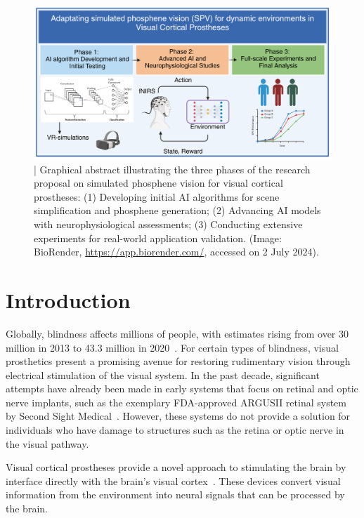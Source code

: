 \documentclass[10pt]{article}
\begin{document}
\pagestyle{rest} %
\clearpage %

\begin{figure}[ht!]
  \centering
  \includegraphics[width=1.0\textwidth]{imgs/SPV_VCP_pipeline.png}
  \caption{| Graphical abstract illustrating the three phases of the research proposal on simulated phosphene vision for visual cortical prostheses: (1) Developing initial AI algorithms for scene simplification and phosphene generation; (2) Advancing AI models with neurophysiological assessments; (3) Conducting extensive experiments for real-world application validation. (Image: BioRender, \href{https://app.biorender.com/}{https://app.biorender.com/}, accessed on 2 July 2024).}\label{fig:graphical_abstract}
\end{figure}

\section*{Introduction}\label{sec:intro}
Globally, blindness affects millions of people, with estimates rising from over
30 million in 2013 to 43.3 million in
2020~\parencite{stevensGlobalPrevalenceVision2013,bourneTrendsPrevalenceBlindness2021}.
For certain types of blindness, visual prosthetics present a promising avenue
for restoring rudimentary vision through electrical stimulation of the visual
system. In the past decade, significant attempts have already been made in early
systems that focus on retinal and optic nerve implants, such as the exemplary
FDA-approved ARGUSII retinal system by Second Sight
Medical~\parencite{hoLongTermResultsEpiretinal2015}. However, these systems do
not provide a solution for individuals who have damage to structures such as the
retina or optic nerve in the visual pathway.

Visual cortical prostheses provide a novel approach to stimulating the brain by
interface directly with the brain's visual
cortex~\parencite{deruytervansteveninckRealworldIndoorMobility2022}.
These devices convert visual information from the environment into neural
signals that can be processed by the brain.
\end{document}
